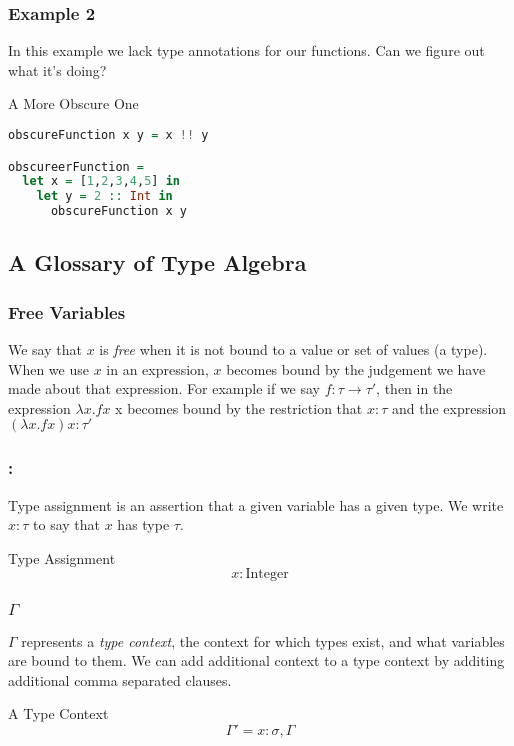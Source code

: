 \documentclass{beamer}
\begin{document}
\begin{frame}[fragile]
  \frametitle{Example 2}
  In this example we lack type annotations for our functions.  Can we
  figure out what it's doing?
  \begin{exampleblock}{A More Obscure One}
    \begin{lstlisting}[language=haskell]
obscureFunction x y = x !! y

obscureerFunction =
  let x = [1,2,3,4,5] in
    let y = 2 :: Int in
      obscureFunction x y
    \end{lstlisting}
  \end{exampleblock}
\end{frame}

\subsection{A Glossary of Type Algebra}

\begin{frame}
  \frametitle{Free Variables}

  We say that $x$ is \emph{free} when it is not bound to a value or
  set of values (a type).  When we use $x$ in an expression, $x$
  becomes bound by the judgement we have made about that expression.
  For example if we say $f : \tau \rightarrow \tau'$, then in the
  expression $\lambda x. f x$ x becomes bound by the restriction that
  $x : \tau$ and the expression $(\lambda x . f x) x : \tau'$

\end{frame}


\begin{frame}
  \frametitle{:}
  Type assignment is an assertion that a given variable has a given
  type.  We write $x : \tau$ to say that $x$ has type $\tau$.
  \begin{exampleblock}{Type Assignment}
    \[
      x : \text{Integer}
    \]
  \end{exampleblock}
\end{frame}

\begin{frame}
  \frametitle{$\Gamma$}
  $\Gamma$ represents a \emph{type context}, the context for which
  types exist, and what variables are bound to them.  We can add
  additional context to a type context by additing additional comma
  separated clauses.
  \begin{exampleblock}{A Type Context}
    \[
      \Gamma' = x : \sigma, \Gamma
    \]
  \end{exampleblock}

\end{frame}
\end{document}
